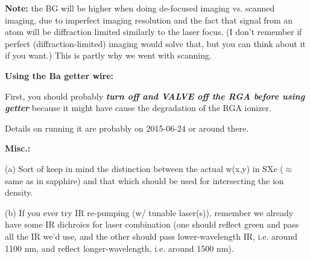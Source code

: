 \documentclass{article}
\begin{document}
\vspace{3mm}

\noindent
\textbf{\color{red}Note:}  the BG will be higher when doing de-focused imaging vs. scanned imaging, due to imperfect imaging resolution and the fact that signal from an atom will be diffraction limited similarly to the laser focus.  (I don't remember if perfect (diffraction-limited) imaging would solve that, but you can think about it if you want.)  This is partly why we went with scanning.

\newpage

\noindent
\textbf{Using the Ba getter wire:}

First, you should probably \emph{\textbf{turn off and VALVE off the RGA before using getter}} because it might have cause the degradation of the RGA ionizer.

Details on running it are probably on 2015-06-24 or around there.

\vspace{5mm}

\noindent
\textbf{Misc.:}

\vspace{2mm}

\noindent
(a) Sort of keep in mind the distinction between the actual w(x,y) in SXe ($\approx$same as in sapphire) and that which should be used for intersecting the ion density.

\vspace{2mm}

\noindent
(b) If you ever try IR re-pumping (w/ tunable laser(s)), remember we already have some IR dichroics for laser combination (one should reflect green and pass all the IR we'd use, and the other should pass lower-wavelength IR, i.e. around 1100 nm, and reflect longer-wavelength, i.e. around 1500 nm).
\end{document}
